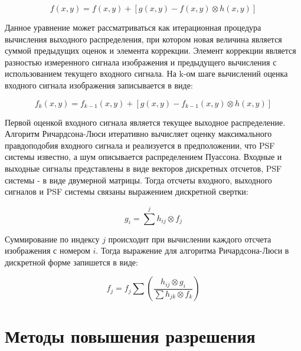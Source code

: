 \begin{equation}
	f(x,y)=f(x,y)+[g(x,y)-f(x,y)\otimes h(x,y)]
\end{equation}

Данное уравнение может рассматриваться как итерационная процедура вычисления выходного распределения, при котором новая величина является суммой предыдущих оценок  и элемента коррекции. Элемент коррекции является разностью измеренного сигнала изображения и предыдущего вычисления с использованием текущего входного сигнала. На k-ом шаге вычислений оценка входного сигнала изображения записывается в виде:

\begin{equation}
	f_k(x,y)=f_{k-1}(x,y)+[g(x,y)-f_{k-1}(x,y)\otimes h(x,y)]
\end{equation}

Первой оценкой входного сигнала является текущее выходное распределение. Алгоритм Ричардсона-Люси итеративно вычисляет оценку максимального правдоподобия входного сигнала и реализуется в предположении, что PSF системы известно, а шум описывается распределением Пуассона. Входные и выходные сигналы представлены в виде векторов дискретных отсчетов, PSF системы - в виде двумерной матрицы. Тогда отсчеты входного, выходного сигналов и PSF системы связаны выражением дискретной свертки:

\begin{equation}\label{key}
	g_i = \sum^j h_{ij}\otimes f_j
\end{equation}

Суммирование по индексу $j$ происходит при вычислении каждого отсчета изображения с номером $i$. Тогда выражение для алгоритма Ричардсона-Люси в дискретной форме запишется в виде:

\begin{equation}
	f_j = 	f_j \sum (\frac{h_{ij}\otimes g_i}{\sum h_{jk}\otimes f_k})
\end{equation}


\section{Методы повышения разрешения}

